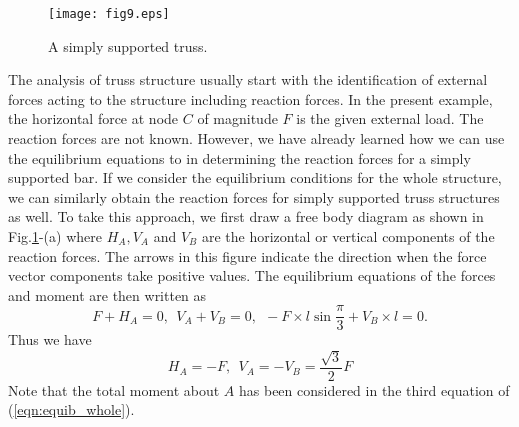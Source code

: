 ﻿\documentclass[10pt,a4j]{article}
\begin{document}
\begin{figure}[h]
	\begin{center}
	\texttt{[image: fig9.eps]} 
	\end{center}
	\caption{A simply supported truss.} 
	\label{fig:fig9}
\end{figure}
The analysis of truss structure usually start with the identification of 
external forces acting to the structure including reaction forces. 
In the present example, the horizontal force at node $C$ of magnitude $F$ 
is the given external load. The reaction forces are not known. 
However, we have already learned how we can use the equilibrium equations to 
in determining the reaction forces for a simply supported bar. 
If we consider the equilibrium conditions for the whole structure, 
we can similarly obtain the reaction forces for simply supported truss structures 
as well. To take this approach, we first draw a free body diagram as shown in 
Fig.\ref{fig:fig9}-(a) where $H_A, V_A$ and $V_B$ are the horizontal 
or vertical components of the reaction forces. The arrows in this figure 
indicate the direction when the force vector components take positive values. 
The equilibrium equations of the forces and moment are then written as 
\begin{equation}
	F+H_A=0, \ \ V_A+V_B=0, \ \ -F\times l\sin\frac{\pi}{3}+V_B\times l=0. 
	\label{eqn:equib_whole}
\end{equation}
Thus we have 
\begin{equation}
	H_A=-F, \ \ V_A=-V_B=\frac{\sqrt{3}}{2}F
	\label{eqn:reac_frc}
\end{equation}
Note that the total moment about $A$ has been considered in the third equation of (\ref{eqn:equib_whole}).
\end{document}
